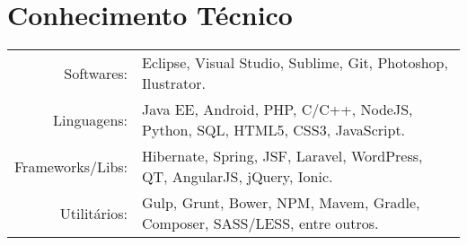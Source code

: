 \documentclass[a4paper,10pt]{article}
\begin{document}
\section{Conhecimento Técnico}
\begin{tabular}{rl}
	Softwares: & Eclipse, Visual Studio, Sublime, Git, Photoshop, Ilustrator.\\
	Linguagens: & Java EE, Android, PHP, C/C++, NodeJS, Python, SQL, HTML5, CSS3, JavaScript.\\
	Frameworks/Libs: & Hibernate, Spring, JSF, Laravel, WordPress, QT, AngularJS, jQuery, Ionic.\\
	Utilitários: & Gulp, Grunt, Bower, NPM, Mavem, Gradle, Composer, SASS/LESS, entre outros.
\end{tabular}

\end{document}
